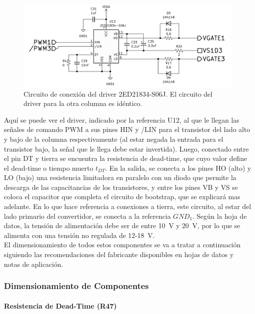 \begin{figure}[h]
    \centering
    \includegraphics[scale=0.95]{Imagenes/Circuito Driver.png}
    \caption{Circuito de conexión del driver 2ED21834-S06J. El circuito del driver para la otra columna es idéntico.}
    \label{circuito_driver}
\end{figure}

Aquí se puede ver el driver, indicado por la referencia U12, al que le llegan las señales de comando PWM a sus pines HIN y /LIN para el transistor del lado alto y bajo de la columna respectivamente (al estar negada  la entrada para el transistor bajo, la señal que le llega debe estar invertida). Luego, conectado entre el pin DT y tierra se encuentra la resistencia de dead-time, que cuyo valor define el dead-time o tiempo muerto $t_{DT}$. En la salida, se conecta a los pines HO (alto) y LO (bajo) una resistencia limitadora en paralelo con un diodo que permite la descarga de las capacitancias de los transistores, y entre los pines VB y VS se coloca el capacitor que completa el circuito de bootstrap, que se explicará mas adelante. En lo que hace referencia a conexiones a tierra, este circuito, al estar del lado primario del convertidor, se conecta a la referencia $GND_1$. Según la hoja de datos, la tensión de alimentación debe ser de entre \SI[]{10}[]{\volt} y \SI[]{20}[]{\volt}, por lo que se alimenta con una tensión no regulada de \num{12}-\SI[]{18}[]{\volt}.\\

El dimensionamiento de todos estos componentes se va a tratar a continuación siguiendo las recomendaciones del fabricante disponibles en hojas de datos y notas de aplicación.\\

\subsubsection{Dimensionamiento de Componentes}

\paragraph{Resistencia de Dead-Time (R47)}

